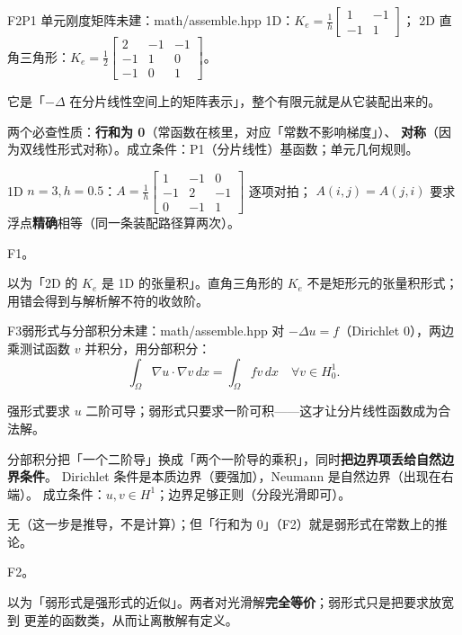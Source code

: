 \begin{know}{F2}{P1 单元刚度矩阵}{未建：math/assemble.hpp}
 1D：$K_e=\frac1h\begin{bmatrix}1&-1\\-1&1\end{bmatrix}$；
2D 直角三角形：$K_e=\frac12\begin{bmatrix}2&-1&-1\\-1&1&0\\-1&0&1\end{bmatrix}$。

 它是「$-\Delta$ 在分片线性空间上的矩阵表示」，整个有限元就是从它装配出来的。

 两个必查性质：\textbf{行和为 0}（常函数在核里，对应「常数不影响梯度」）、
\textbf{对称}（因为双线性形式对称）。成立条件：P1（分片线性）基函数；单元几何规则。

 1D $n=3,h=0.5$：$A=\frac1h\begin{bmatrix}1&-1&0\\-1&2&-1\\0&-1&1\end{bmatrix}$ 逐项对拍；
$A(i,j)=A(j,i)$ 要求浮点\textbf{精确}相等（同一条装配路径算两次）。

 F1。

 以为「2D 的 $K_e$ 是 1D 的张量积」。直角三角形的 $K_e$ 不是矩形元的张量积形式；
用错会得到与解析解不符的收敛阶。
\end{know}

\begin{know}{F3}{弱形式与分部积分}{未建：math/assemble.hpp}
 对 $-\Delta u=f$（Dirichlet 0），两边乘测试函数 $v$ 并积分，用分部积分：
\[
\int_\Omega\nabla u\cdot\nabla v\,dx=\int_\Omega fv\,dx\quad\forall v\in H^{1}_{0}.
\]

 强形式要求 $u$ 二阶可导；弱形式只要求一阶可积——这才让分片线性函数成为合法解。

 分部积分把「一个二阶导」换成「两个一阶导的乘积」，同时\textbf{把边界项丢给自然边界条件}。
Dirichlet 条件是本质边界（要强加），Neumann 是自然边界（出现在右端）。
成立条件：$u,v\in H^{1}$；边界足够正则（分段光滑即可）。

 无（这一步是推导，不是计算）；但「行和为 0」（F2）就是弱形式在常数上的推论。

 F2。

 以为「弱形式是强形式的近似」。两者对光滑解\textbf{完全等价}；弱形式只是把要求放宽到
更差的函数类，从而让离散解有定义。
\end{know}

